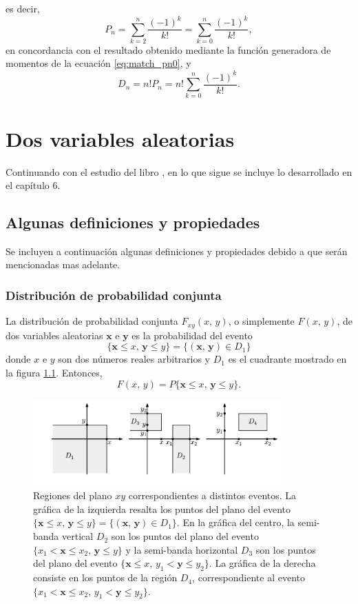 \documentclass[a4paper]{report}
\newcommand{\x}{\mathbf{x}}
\newcommand{\y}{\mathbf{y}}
\begin{document}
es decir,
\[
 P_n=\sum_{k=2}^{n}\frac{(-1)^k}{k!}=\sum_{k=0}^{n}\frac{(-1)^k}{k!},
\]
en concordancia con el resultado obtenido mediante la función generadora de momentos de la ecuación \ref{eq:match_pn0}, y
\[
 D_n=n!P_n=n!\sum_{k=0}^{n}\frac{(-1)^k}{k!}.
\]

\chapter{Dos variables aleatorias}

Continuando con el estudio del libro \cite{papoulis2002probability}, en lo que sigue se incluye lo desarrollado en el capítulo 6.

\section{Algunas definiciones y propiedades}

Se incluyen a continuación algunas definiciones y propiedades debido a que serán mencionadas mas adelante.

\subsection{Distribución de probabilidad conjunta}

La distribución de probabilidad conjunta \(F_{xy}(x,\,y)\), o simplemente \(F(x,\,y)\), de dos variables aleatorias \(\x\) e \(\y\) es la probabilidad del evento
\[
 \{\x\leq x,\, \y\leq y\}=\{(\x,\,\y)\in D_1\}
\]
donde \(x\) e \(y\) son dos números reales arbitrarios y \(D_1\) es el cuadrante mostrado en la figura \ref{fig:joint_distribution_region}. Entonces,
\[
 F(x,\,y)=P\{\x\leq x,\, \y\leq y\}.
\]
\begin{figure}[!htb]
\begin{center}
  \includegraphics[width=0.85\textwidth]{figuras/joint_distribution_region_v2.pdf}
  \caption{
       Regiones del plano \(xy\) correspondientes a distintos eventos. La gráfica de la izquierda resalta los puntos del plano del evento \(\{\x\leq x,\, \y\leq y\}=\{(\x,\,\y)\in D_1\}\). En la gráfica del centro, la semi-banda vertical \(D_2\) son los puntos del plano del evento \(\{x_1<\x\leq x_2,\,\y\leq y\}\) y la semi-banda horizontal \(D_3\) son los puntos del plano del evento \(\{\x\leq x,\,y_1<\y\leq y_2\}\). La gráfica de la derecha consiste en los puntos de la región \(D_4\), correspondiente al evento \(\{x_1<\x\leq x_2,\,y_1<\y\leq y_2\}\).
    } \label{fig:joint_distribution_region}
\end{center}
\end{figure}
\end{document}
